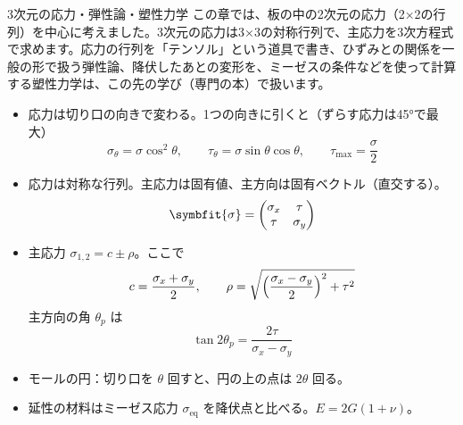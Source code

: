\begin{phsaki}{3次元の応力・弾性論・塑性力学}
この章では、板の中の2次元の応力（2×2の行列）を中心に考えました。3次元の応力は3×3の対称行列で、主応力を3次方程式で求めます。応力の行列を「テンソル」という道具で書き、ひずみとの関係を一般の形で扱う弾性論、降伏したあとの変形を、ミーゼスの条件などを使って計算する塑性力学は、この先の学び（専門の本）で扱います。
\end{phsaki}

\begin{taisetsu}
\begin{itemize}[leftmargin=1.2\zw, itemsep=2pt, topsep=1pt, label={\color{bkTheme}●}]
\item 応力は切り口の向きで変わる。1つの向きに引くと（ずらす応力は45°で最大）
\[\sigma_\theta=\sigma\cos^2\theta,\qquad\tau_\theta=\sigma\sin\theta\cos\theta,\qquad\tau_{\max}=\frac{\sigma}{2}\]
\item 応力は対称な行列。主応力は固有値、主方向は固有ベクトル（直交する）。
\[\symbfit{\sigma}=\begin{pmatrix}\sigma_x&\tau\\\tau&\sigma_y\end{pmatrix}\]
\item 主応力 $\sigma_{1,2}=c\pm\rho$。ここで
\[c=\frac{\sigma_x+\sigma_y}{2},\qquad \rho=\sqrt{\Bigl(\frac{\sigma_x-\sigma_y}{2}\Bigr)^2+\tau^2}\]
主方向の角 $\theta_p$ は
\[\tan2\theta_p=\frac{2\tau}{\sigma_x-\sigma_y}\]
\item モールの円：切り口を $\theta$ 回すと、円の上の点は $2\theta$ 回る。
\item 延性の材料はミーゼス応力 $\sigma_{\mathrm{eq}}$ を降伏点と比べる。$E=2G(1+\nu)$。
\end{itemize}
\end{taisetsu}


\begin{kotoba}\small
{}
\end{kotoba}



